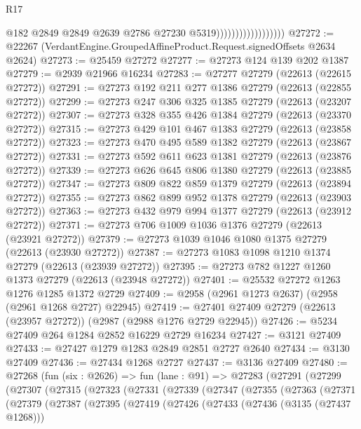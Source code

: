 \begin{lexlean}{R17}
\begin{coremodule}
                                        @182
                                        @2849
                                        @2849
                                        @2639
                                        @2786
                                        @27230
                                        @5319))))))))))))))))))
@27272 := @22267 (VerdantEngine.GroupedAffineProduct.Request.signedOffsets @2634 @2624)
@27273 := @25459 @27272
@27277 := @27273 @124 @139 @202 @1387
@27279 := @2939 @21966 @16234
@27283 := @27277 @27279 (@22613 (@22615 @27272))
@27291 := @27273 @192 @211 @277 @1386 @27279 (@22613 (@22855 @27272))
@27299 := @27273 @247 @306 @325 @1385 @27279 (@22613 (@23207 @27272))
@27307 := @27273 @328 @355 @426 @1384 @27279 (@22613 (@23370 @27272))
@27315 := @27273 @429 @101 @467 @1383 @27279 (@22613 (@23858 @27272))
@27323 := @27273 @470 @495 @589 @1382 @27279 (@22613 (@23867 @27272))
@27331 := @27273 @592 @611 @623 @1381 @27279 (@22613 (@23876 @27272))
@27339 := @27273 @626 @645 @806 @1380 @27279 (@22613 (@23885 @27272))
@27347 := @27273 @809 @822 @859 @1379 @27279 (@22613 (@23894 @27272))
@27355 := @27273 @862 @899 @952 @1378 @27279 (@22613 (@23903 @27272))
@27363 := @27273 @432 @979 @994 @1377 @27279 (@22613 (@23912 @27272))
@27371 := @27273 @706 @1009 @1036 @1376 @27279 (@22613 (@23921 @27272))
@27379 := @27273 @1039 @1046 @1080 @1375 @27279 (@22613 (@23930 @27272))
@27387 := @27273 @1083 @1098 @1210 @1374 @27279 (@22613 (@23939 @27272))
@27395 := @27273 @782 @1227 @1260 @1373 @27279 (@22613 (@23948 @27272))
@27401 := @25532 @27272 @1263 @1276 @1285 @1372 @2729
@27409 := @2958 (@2961 @1273 @2637) (@2958 (@2961 @1268 @2727) @22945)
@27419 := @27401 @27409 @27279 (@22613 (@23957 @27272)) (@2987 (@2988 @1276 @2729 @22945))
@27426 := @5234 @27409 @264 @1284 @2852 @16229 @2729 @16234
@27427 := @3121 @27409
@27433 := @27427 @1279 @1283 @2849 @2851 @2727 @2640
@27434 := @3130 @27409
@27436 := @27434 @1268 @2727
@27437 := @3136 @27409
@27480 := @27268
    (fun (six : @2626) =>
    fun (lane : @91) =>
    @27283
      (@27291
        (@27299
          (@27307
            (@27315
              (@27323
                (@27331
                  (@27339
                    (@27347
                      (@27355
                        (@27363
                          (@27371
                            (@27379
                              (@27387
                                (@27395
                                  (@27419
                                    (@27426
                                      (@27433
                                        (@27436 (@3135 (@27437 @1268)))

\end{coremodule}
\end{lexlean}
